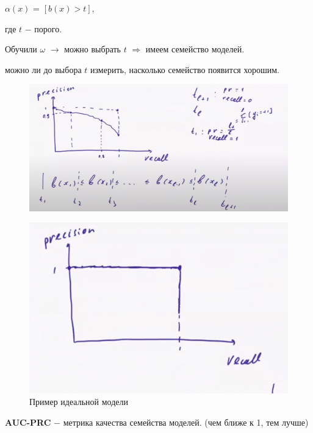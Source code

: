             \begin{center}
                $\alpha(x)$ = $[b(x) > t]$,
            \end{center}
            где $t$ $-$ порого.
            \begin{center}
                Обучили $\omega$ $\longrightarrow$ можно выбрать $t$ $\Longrightarrow$ имеем семейство моделей.
            \end{center}

             можно ли до выбора $t$ измерить, насколько семейство появится хорошим.\\
            \begin{figure}[H]
                \centering
                \includegraphics[width=0.85 \textwidth]{images/5lecture/Model1_PRC.png}
            \end{figure}
            
            \begin{figure}[H]
                \centering
                \includegraphics[width=0.55 \textwidth]{images/5lecture/Ideal_PRC.png}
                \caption{Пример идеальной модели}
            \end{figure}


            \begin{definition}
                \textbf{AUC-PRC} $-$ метрика качества семейства моделей. (чем ближе к 1, тем лучше)
            \end{definition}

